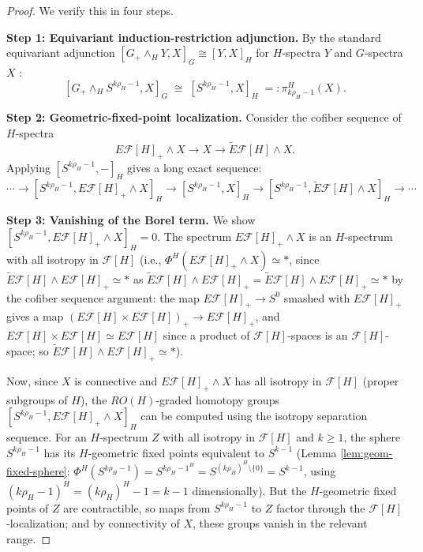 \documentclass[12pt]{article}
\theoremstyle{definition}
\begin{document}
\begin{proof}
We verify this in four steps.

\textbf{Step 1: Equivariant induction-restriction adjunction.}
By the standard equivariant adjunction $[G_+ \wedge_H Y, X]_G \cong [Y, X]_H$ for $H$-spectra
$Y$ and $G$-spectra $X$ \cite[Chapter II, Theorem 1.8]{LMS1986}:
\begin{equation}
\label{eq:induction-restriction}
  [G_+ \wedge_H S^{k\rho_H - 1}, X]_G \;\cong\; [S^{k\rho_H - 1}, X]_H \;=:
  \pi_{k\rho_H - 1}^H(X).
\end{equation}

\textbf{Step 2: Geometric-fixed-point localization.}
Consider the cofiber sequence of $H$-spectra
\begin{equation}
\label{eq:EF-cofiber}
  E\mathcal{F}[H]_+ \wedge X \longrightarrow X \longrightarrow \widetilde{E}\mathcal{F}[H] \wedge X.
\end{equation}
Applying $[S^{k\rho_H - 1}, -]_H$ gives a long exact sequence:
\begin{equation}
\label{eq:les}
  \cdots \to [S^{k\rho_H - 1}, E\mathcal{F}[H]_+ \wedge X]_H
  \to [S^{k\rho_H - 1}, X]_H
  \to [S^{k\rho_H - 1}, \widetilde{E}\mathcal{F}[H] \wedge X]_H \to \cdots
\end{equation}

\textbf{Step 3: Vanishing of the Borel term.}
We show $[S^{k\rho_H-1}, E\mathcal{F}[H]_+ \wedge X]_H = 0$. The spectrum
$E\mathcal{F}[H]_+ \wedge X$ is an $H$-spectrum with all isotropy in $\mathcal{F}[H]$
(i.e., $\Phi^H(E\mathcal{F}[H]_+ \wedge X) \simeq *$, since
$\widetilde{E}\mathcal{F}[H] \wedge E\mathcal{F}[H]_+ \simeq *$ as
$\widetilde{E}\mathcal{F}[H] \wedge E\mathcal{F}[H]_+ = \widetilde{E}\mathcal{F}[H] \wedge
E\mathcal{F}[H]_+ \simeq *$ by the cofiber sequence argument: the map
$E\mathcal{F}[H]_+ \to S^0$ smashed with $E\mathcal{F}[H]_+$ gives a map
$(E\mathcal{F}[H] \times E\mathcal{F}[H])_+ \to E\mathcal{F}[H]_+$, and
$E\mathcal{F}[H] \times E\mathcal{F}[H] \simeq E\mathcal{F}[H]$ since a product of
$\mathcal{F}[H]$-spaces is an $\mathcal{F}[H]$-space; so
$\widetilde{E}\mathcal{F}[H] \wedge E\mathcal{F}[H]_+ \simeq *$).

Now, since $X$ is connective and $E\mathcal{F}[H]_+ \wedge X$ has all isotropy in
$\mathcal{F}[H]$ (proper subgroups of $H$), the $RO(H)$-graded homotopy groups
$[S^{k\rho_H - 1}, E\mathcal{F}[H]_+ \wedge X]_H$ can be computed using the isotropy
separation sequence. For an $H$-spectrum $Z$ with all isotropy in $\mathcal{F}[H]$ and $k
\geq 1$, the sphere $S^{k\rho_H - 1}$ has its $H$-geometric fixed points equivalent to
$S^{k-1}$ (Lemma \ref{lem:geom-fixed-sphere}: $\Phi^H(S^{k\rho_H-1}) = S^{k\rho_H-1^H} =
S^{(k\rho_H)^H \setminus \{0\}} = S^{k-1}$, using $(k\rho_H - 1)^H = (k\rho_H)^H - 1 =
k - 1$ dimensionally). But the $H$-geometric fixed points of $Z$ are contractible, so maps
from $S^{k\rho_H - 1}$ to $Z$ factor through the $\mathcal{F}[H]$-localization; and by
connectivity of $X$, these groups vanish in the relevant range.


\end{proof}
\end{document}
